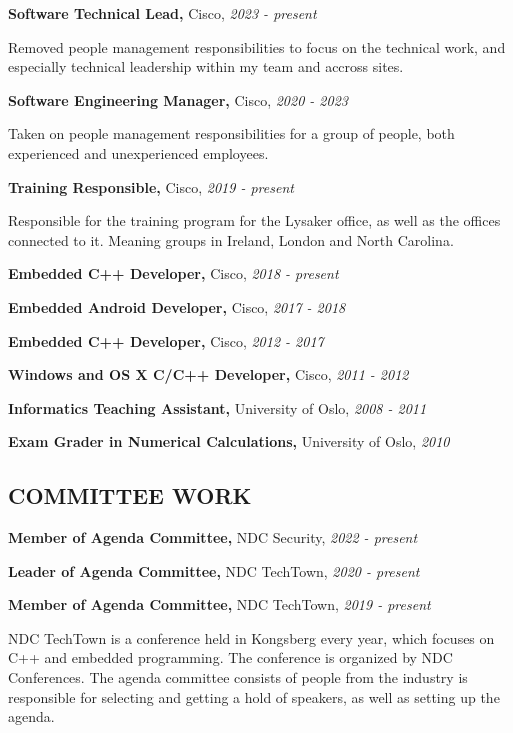 \documentclass{article}
\newcommand\CVEntry[3]{
  {\bf #1,} #2, {\it #3}
}
\newcommand\CVComment[4]{
  \CVEntry{#1}{#2}{#3}

  #4
}
\begin{document}
\begin{addmargin}[2em]{0em}
  \CVComment{Software Technical Lead}{Cisco}{2023 - present}{
    Removed people management responsibilities to focus on the technical work, and especially
    technical leadership within my team and accross sites.}

  \CVComment{Software Engineering Manager}{Cisco}{2020 - 2023}{
    Taken on people management responsibilities for a group of people, both experienced and 
    unexperienced employees.}

  \CVComment{Training Responsible}{Cisco}{2019 - present}{
    Responsible for the training program for the Lysaker office, as well as the offices connected to
    it. Meaning groups in Ireland, London and North Carolina.}

  \CVEntry{Embedded C++ Developer}{Cisco}{2018 - present}

  \CVEntry{Embedded Android Developer}{Cisco}{2017 - 2018}

  \CVEntry{Embedded C++ Developer}{Cisco}{2012 - 2017}

  \CVEntry{Windows and OS X C/C++ Developer}{Cisco}{2011 - 2012}

  \CVEntry{Informatics Teaching Assistant}{University of Oslo}{2008 - 2011}

  \CVEntry{Exam Grader in Numerical Calculations}{University of Oslo}{2010}

\end{addmargin}

\subsection*{COMMITTEE WORK}

\begin{addmargin}[2em]{0em}
  \CVEntry{Member of Agenda Committee}{NDC Security}{2022 - present}

  \CVEntry{Leader of Agenda Committee}{NDC TechTown}{2020 - present}

  \CVComment{Member of Agenda Committee}{NDC TechTown}{2019 - present}{
    NDC TechTown is a conference held in Kongsberg every year, which focuses on C++
    and embedded programming. The conference is organized by NDC Conferences. The
    agenda committee consists of people from the industry is responsible for
    selecting and getting a hold of speakers, as well as setting up the agenda.}

\end{addmargin}
\end{document}
